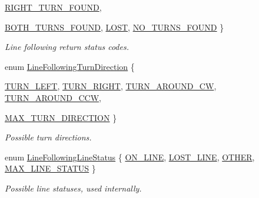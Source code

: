 \begin{DoxyCompactItemize}
\hyperlink{namespaceIDP_a5993bdfdd901fc5521c8df42dca43bd0a4e943d3404f29cc547855d1097727e63}{RIGHT\_\-TURN\_\-FOUND}, 
\par
\hyperlink{namespaceIDP_a5993bdfdd901fc5521c8df42dca43bd0adb771c4661fabd68ed4c31c504088e93}{BOTH\_\-TURNS\_\-FOUND}, 
\hyperlink{namespaceIDP_a5993bdfdd901fc5521c8df42dca43bd0ab68c7dd029c69ce53f446acabd19455c}{LOST}, 
\hyperlink{namespaceIDP_a5993bdfdd901fc5521c8df42dca43bd0aaa2e9a813db91657570cf2eeb78d0983}{NO\_\-TURNS\_\-FOUND}
 \}
\begin{DoxyCompactList}\small\item\em Line following return status codes. \item\end{DoxyCompactList}\item 
enum \hyperlink{namespaceIDP_aba52d8ae6ecf9eb4c7edb518bcc02544}{LineFollowingTurnDirection} \{ \par
\hyperlink{namespaceIDP_aba52d8ae6ecf9eb4c7edb518bcc02544a999d44c9ef45538375c7b316d0a51059}{TURN\_\-LEFT}, 
\hyperlink{namespaceIDP_aba52d8ae6ecf9eb4c7edb518bcc02544a630a2f356cbbe3205557ed0f82f25eec}{TURN\_\-RIGHT}, 
\hyperlink{namespaceIDP_aba52d8ae6ecf9eb4c7edb518bcc02544af2abadf838c7b083430a3671c9831990}{TURN\_\-AROUND\_\-CW}, 
\hyperlink{namespaceIDP_aba52d8ae6ecf9eb4c7edb518bcc02544a10a1f928d94973b92dcebf2e79858e92}{TURN\_\-AROUND\_\-CCW}, 
\par
\hyperlink{namespaceIDP_aba52d8ae6ecf9eb4c7edb518bcc02544aa74bb750e694576bc85d62d37534d22e}{MAX\_\-TURN\_\-DIRECTION}
 \}
\begin{DoxyCompactList}\small\item\em Possible turn directions. \item\end{DoxyCompactList}\item 
enum \hyperlink{namespaceIDP_ac3688e4c6bc9b671b09672d71ebccc40}{LineFollowingLineStatus} \{ \hyperlink{namespaceIDP_ac3688e4c6bc9b671b09672d71ebccc40ae98c6f22ce3cb9115070fa63dc53be54}{ON\_\-LINE}, 
\hyperlink{namespaceIDP_ac3688e4c6bc9b671b09672d71ebccc40a6d73c89419d3f6d4b5816b31ed4a1d50}{LOST\_\-LINE}, 
\hyperlink{namespaceIDP_ac3688e4c6bc9b671b09672d71ebccc40a01ca34a0cd3291e4677952ffa87bdf05}{OTHER}, 
\hyperlink{namespaceIDP_ac3688e4c6bc9b671b09672d71ebccc40a7f43bbf697f9db6ab9a5f8f09cab156b}{MAX\_\-LINE\_\-STATUS}
 \}
\begin{DoxyCompactList}\small\item\em Possible line statuses, used internally. \item\end{DoxyCompactList}\item 

\end{DoxyCompactItemize}
